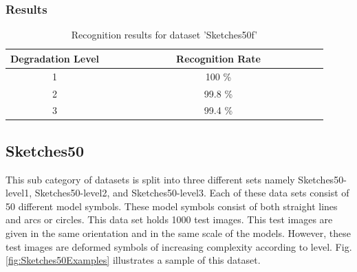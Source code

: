 \subsubsection{Results}
\begin{table}[H]
\centering
\caption{Recognition results for dataset 'Sketches50f'}
\begin{tabular}{ccccccccccccccc}
  \hline
     Degradation Level & & & & & & & & Recognition Rate \\
  \hline
     1 & & & & & & & &  100 \% \\
     2 & & & & & & & &  99.8 \% \\
     3 & & & & & & & &  99.4 \% \\

  \hline
\end{tabular}
\end{table}
\vspace{49.3mm}

\subsection{Sketches50}
This sub category of datasets is split into three different sets namely Sketches50-level1, Sketches50-level2, and Sketches50-level3. Each of these data sets consist of 50 different model symbols. These model symbols consist of both straight lines and arcs or circles. This data set holds 1000 test images. This test images are given in the same orientation and in the same scale of the models. However, these test images are deformed symbols of increasing complexity according to level. Fig.\ref{fig:Sketches50Examples} illustrates a sample of this dataset.

